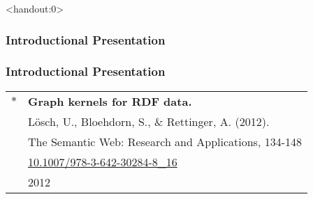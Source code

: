 \documentclass[babel,german,aspectratio=169]{beamer}
\begin{document}
\begin{frame}<handout:0>
	\visible{\titlepage}
	\frametitle{Introductional Presentation}
	\pause%
	\vspace{50mm}
	\visible{\titlepage}
\end{frame}	

\begin{frame}
\frametitle{Introductional Presentation}
\begin{center}
\begin{tabular}{ll}
	 $\ast$ & \textbf{Graph kernels for RDF data.}\\
	 & Lösch, U., Bloehdorn, S., \& Rettinger, A. (2012).\\
	 & The Semantic Web: Research and Applications, 134-148\\
	 & \href{https://doi.org/10.1007/978-3-642-30284-8_16}{\color{blue}10.1007/978-3-642-30284-8\_16} \\
	  & 2012\\
\end{tabular} 
\vspace{5mm}
\end{center}

\end{frame}

%

%
%

%
%
%
\end{document}
